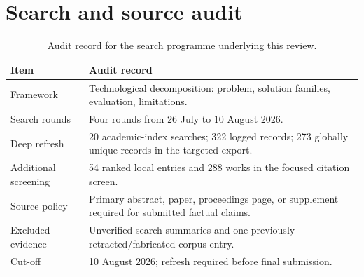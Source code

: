 \chapter{Search and source audit}

\begin{table}[htbp]
\centering
\small
\caption{Audit record for the search programme underlying this review.}
\label{tab:audit}
\begin{tabularx}{\textwidth}{L{3.0cm}Y}
\toprule
\textbf{Item} & \textbf{Audit record} \\
\midrule
Framework & Technological decomposition: problem, solution families, evaluation, limitations. \\
Search rounds & Four rounds from 26 July to 10 August 2026. \\
Deep refresh & 20 academic-index searches; 322 logged records; 273 globally unique records in the targeted export. \\
Additional screening & 54 ranked local entries and 288 works in the focused citation screen. \\
Source policy & Primary abstract, paper, proceedings page, or supplement required for submitted factual claims. \\
Excluded evidence & Unverified search summaries and one previously retracted/fabricated corpus entry. \\
Cut-off & 10 August 2026; refresh required before final submission. \\
\bottomrule
\end{tabularx}
\end{table}


